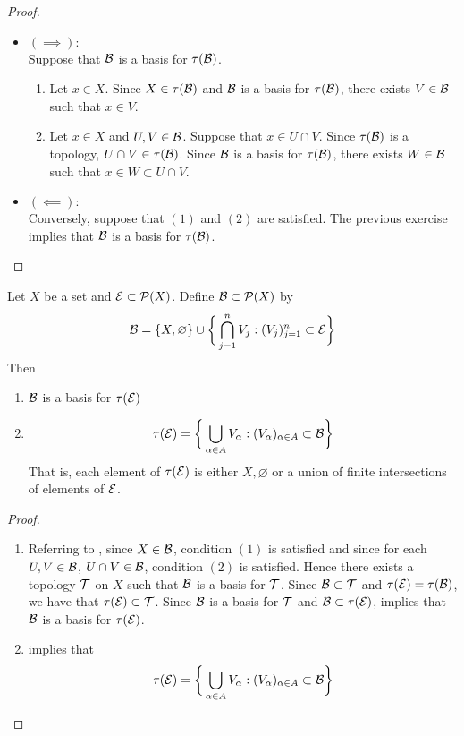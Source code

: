 \documentclass{book}
\begin{document}
	\begin{proof}\
		\begin{itemize}
			\item  $(\implies): $ \\
			Suppose that $\mathcal{B}$ is a basis for $\tau(\mathcal{B})$. 
			\begin{enumerate}
				\item Let $x \in X$. Since $X \in \tau(\mathcal{B})$ and $\mathcal{B}$ is a basis for $\tau(\mathcal{B})$, there exists $V \in \mathcal{B}$ such that $x \in V$.
				\item Let $x \in X$ and $U, V \in \mathcal{B}$. Suppose that $x \in U \cap V$. Since $\tau(\mathcal{B})$ is a topology, $U \cap V \in \tau(\mathcal{B})$. Since $\mathcal{B}$ is a basis for $\tau(\mathcal{B})$, there exists $W \in \mathcal{B}$ such that $x \in W \subset U \cap V$.
			\end{enumerate}
			\item  $(\impliedby): $ \\
			Conversely, suppose that $(1)$ and $(2)$ are satisfied. The previous exercise implies that $\mathcal{B}$ is a basis for $\tau(\mathcal{B})$.
		\end{itemize}
	\end{proof}
	
	\begin{ex} 
	Let $X$ be a set and $\mathcal{E} \subset \mathcal{P}(X)$. Define $\mathcal{B} \subset \mathcal{P}(X)$ by 
	$$\mathcal{B} = \{X, \varnothing\} \cup  \bigg \{\bigcap_{j=1}^n V_j: (V_j)_{j=1}^n \subset \mathcal{E} \bigg \}$$ 
	Then 
	\begin{enumerate}
	\item $\mathcal{B}$ is a basis for $\tau(\mathcal{E})$ 
	\item $$\tau(\mathcal{E}) = \bigg \{ \bigcup_{\alpha \in A} V_{\alpha}: (V_{\alpha})_{\alpha \in A} \subset \mathcal{B} \bigg \}$$ That is, each element of $\tau(\mathcal{E})$ is either $X, \varnothing$ or a union of finite intersections of elements of $\mathcal{E}$. 
	\end{enumerate}
	
	\end{ex}
	
	\begin{proof}\
	\begin{enumerate}
	\item Referring to , since $X \in \mathcal{B}$, condition $(1)$ is satisfied and since for each $U, V \in \mathcal{B}$, $U \cap V \in \mathcal{B}$, condition $(2)$ is satisfied. Hence there exists a topology $\mathcal{T}$ on $X$ such that $\mathcal{B}$ is a basis for $\mathcal{T}$. Since $\mathcal{B} \subset \mathcal{T}$ and $\tau(\mathcal{E}) = \tau(\mathcal{B})$, we have that $\tau(\mathcal{E}) \subset \mathcal{T}$. Since $\mathcal{B}$ is a basis for $\mathcal{T}$ and $\mathcal{B} \subset \tau(\mathcal{E})$,  implies that $\mathcal{B}$ is a basis for $\tau(\mathcal{E})$.
	\item {} implies that $$\tau(\mathcal{E}) = \bigg \{ \bigcup_{\alpha \in A} V_{\alpha}: (V_{\alpha})_{\alpha \in A} \subset \mathcal{B} \bigg \}$$
	\end{enumerate}
	
	\end{proof}
	
\end{document}
